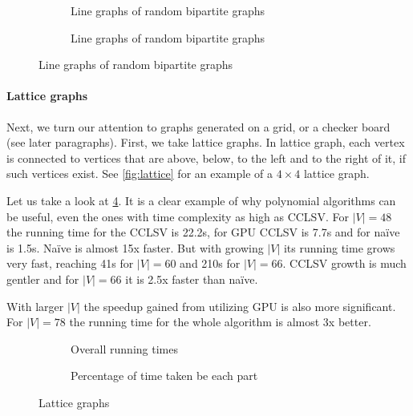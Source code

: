 \begin{figure}
  \begin{subfigure}{\textwidth}
    \centering
    
    \caption{Line graphs of random bipartite graphs}
    \label{plot:perf2Lines}
  \end{subfigure}

  \begin{subfigure}{\textwidth}
    \centering
    
    \caption{Line graphs of random bipartite graphs}
    \label{plot:perf2Det}
  \end{subfigure}
  \caption{Line graphs of random bipartite graphs}
\end{figure}

\paragraph{Lattice graphs}

Next, we turn our attention to graphs generated on a grid, or a checker board (see later paragraphs). First, we take lattice graphs. In lattice graph, each vertex is connected to vertices that are above, below, to the left and to the right of it, if such vertices exist. See \cref{fig:lattice} for an example of a $4 \times 4$ lattice graph.

Let us take a look at \cref{plot:gridLines}. It is a clear example of why polynomial algorithms can be useful, even the ones with time complexity as high as CCLSV. For $|V| = 48$ the running time for the CCLSV is 22.2s, for GPU CCLSV is 7.7s and for na\"ive is 1.5s. Na\"ive is almost 15x faster. But with growing $|V|$ its running time grows very fast, reaching 41s for $|V| = 60$ and 210s for $|V| = 66$. CCLSV growth is much gentler and for $|V| = 66$ it is 2.5x faster than na\"ive.

With larger $|V|$ the speedup gained from utilizing GPU is also more significant. For $|V| = 78$ the running time for the whole algorithm is almost 3x better.

\begin{figure}
  \begin{subfigure}{\textwidth}
    \centering
    
    \caption{Overall running times}
    \label{plot:gridLines}
  \end{subfigure}

  \begin{subfigure}{\textwidth}
    \centering
    
    \caption{Percentage of time taken be each part}
    \label{plot:gridDet}
  \end{subfigure}
  \caption{Lattice graphs}
\end{figure}

